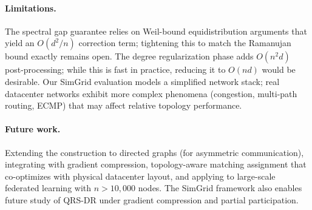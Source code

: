 \documentclass{article}
\begin{document}
\paragraph{Limitations.}
The spectral gap guarantee relies on Weil-bound equidistribution
arguments that yield an $O(d^2/n)$ correction term; tightening this
to match the Ramanujan bound exactly remains open.
The degree regularization phase adds $O(n^2 d)$ post-processing;
while this is fast in practice, reducing it to $O(nd)$ would be
desirable.
Our SimGrid evaluation models a simplified network stack; real
datacenter networks exhibit more complex phenomena (congestion,
multi-path routing, ECMP) that may affect relative topology performance.

\paragraph{Future work.}
Extending the construction to directed graphs (for asymmetric
communication), integrating with gradient compression, topology-aware
matching assignment that co-optimizes with physical datacenter layout,
and applying to large-scale federated learning with $n > 10{,}000$ nodes.
The SimGrid framework also enables future study of QRS-DR
under gradient compression and partial participation.




\end{document}
